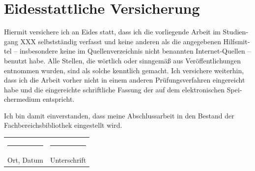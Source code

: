 \documentclass[
	12pt,
	a4paper,
	BCOR10mm,
	DIV14,
	headsepline,
]{scrreprt}
\begin{document}
\thispagestyle{empty}

\section*{Eidesstattliche Versicherung}

\begin{otherlanguage}{ngerman}
Hiermit versichere ich an Eides statt, dass ich die vorliegende Arbeit im Studiengang XXX selbstständig verfasst und keine anderen als die angegebenen Hilfsmittel -- insbesondere keine im Quellenverzeichnis nicht benannten Internet-Quellen -- benutzt habe.
Alle Stellen, die wörtlich oder sinngemäß aus Veröffentlichungen entnommen wurden, sind als solche kenntlich gemacht.
Ich versichere weiterhin, dass ich die Arbeit vorher nicht in einem anderen Prüfungsverfahren eingereicht habe und die eingereichte schriftliche Fassung der auf dem elektronischen Speichermedium entspricht.

\bigskip

\noindent
Ich bin damit einverstanden, dass meine Abschlussarbeit in den Bestand der Fachbereichsbibliothek eingestellt wird.
\end{otherlanguage}

\bigskip
\bigskip
\bigskip

\begin{center}
\begin{tabular}{ll}
	\rule{0.35\textwidth}{0.4pt} & \rule{0.55\textwidth}{0.4pt} \\
	Ort, Datum & Unterschrift
\end{tabular}
\end{center}
\end{document}
